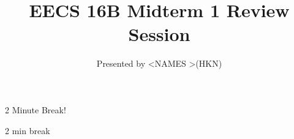 

\title{EECS 16B Midterm 1 Review Session}
\author{Presented by \textless NAMES \textgreater (HKN)}
\date{}

\newcommand{\SlideAccessingLogistics}{@\#}










\begin{frame}
    2 Minute Break!
\end{frame}



	\begin{frame}
	    2 min break
	\end{frame}


	

